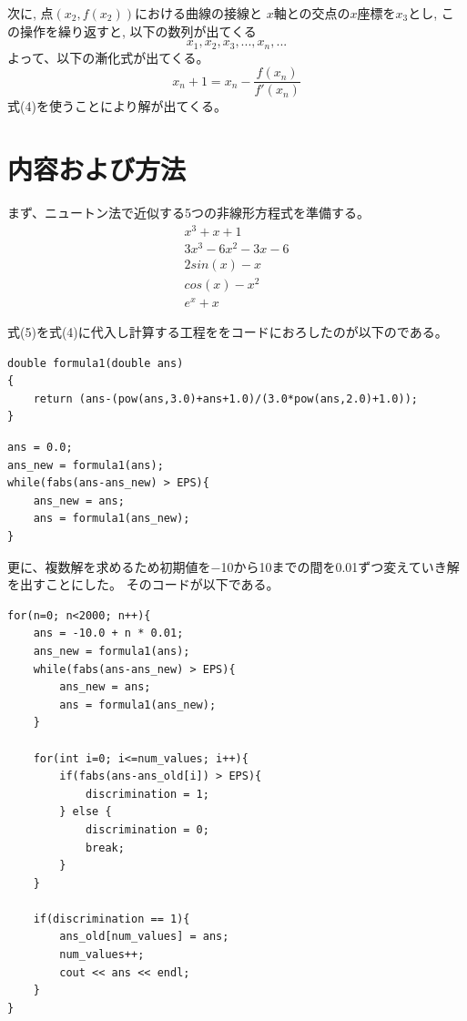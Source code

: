 \documentclass{jsarticle}
\begin{document}
次に, 点$(x_2,f(x_2))$における曲線の接線と $x$軸との交点の$x$座標を$x_3$とし, この操作を繰り返すと, 以下の数列が出てくる 
\begin{equation}
    x_1, x_2, x_3, ..., x_n, ...
\end{equation}
よって、以下の漸化式が出てくる。
\begin{equation}
    x_n+1 = x_n - \frac{f(x_n)}{f'(x_n)}
\end{equation}
式(4)を使うことにより解が出てくる。

\section{内容および方法}
まず、ニュートン法で近似する5つの非線形方程式を準備する。
\begin{eqnarray}
    x^3 + x + 1\\
    3x^3-6x^2-3x-6\\
    2sin(x)-x\\
    cos(x)-x^2\\
    e^x + x
\end{eqnarray}

式(5)を式(4)に代入し計算する工程ををコードにおろしたのが以下のである。
\begin{lstlisting}[basicstyle=\ttfamily\footnotesize, frame=single]
double formula1(double ans)
{
    return (ans-(pow(ans,3.0)+ans+1.0)/(3.0*pow(ans,2.0)+1.0));
}
\end{lstlisting}
\begin{lstlisting}[basicstyle=\ttfamily\footnotesize, frame=single]
ans = 0.0;
ans_new = formula1(ans);
while(fabs(ans-ans_new) > EPS){
    ans_new = ans;
    ans = formula1(ans_new);
}
\end{lstlisting}

更に、複数解を求めるため初期値を−10から10までの間を0.01ずつ変えていき解を出すことにした。
そのコードが以下である。
\begin{lstlisting}[basicstyle=\ttfamily\footnotesize, frame=single]
for(n=0; n<2000; n++){
    ans = -10.0 + n * 0.01;
    ans_new = formula1(ans);
    while(fabs(ans-ans_new) > EPS){
        ans_new = ans;
        ans = formula1(ans_new);
    }

    for(int i=0; i<=num_values; i++){
        if(fabs(ans-ans_old[i]) > EPS){
            discrimination = 1;
        } else {
            discrimination = 0;
            break;
        }
    }

    if(discrimination == 1){
        ans_old[num_values] = ans;
        num_values++;
        cout << ans << endl;
    }
}
\end{lstlisting}
\end{document}
